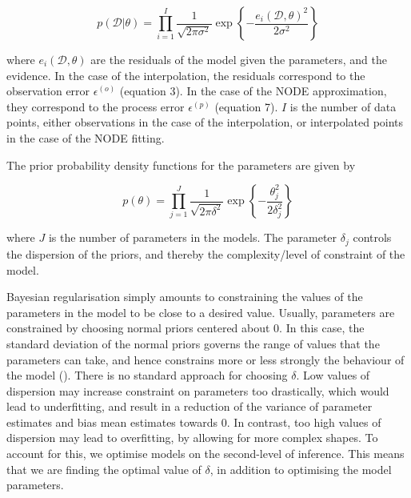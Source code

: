 \documentclass[11pt, oneside]{article}
\begin{document}
\vspace{-0.5cm}
\begin{equation}
	p( \mathcal{D} | \theta) = \prod_{i=1}^{I} \frac{1}{\sqrt{2\pi\sigma^2}}  \exp \left\{ -\frac{e_i(\mathcal{D},\theta)^2}{2\sigma^2}  \right\}
\end{equation}

where $e_i(\mathcal{D},\theta)$ are the residuals of the model given the parameters, and the evidence. 
In the case of the interpolation, the residuals correspond to the observation error $\epsilon^{(o)}$ (equation 3).
In the case of the NODE approximation, they correspond to the process error $\epsilon^{(p)}$ (equation 7).
$I$ is the number of data points, either observations in the case of the interpolation, or interpolated points in the case of the NODE fitting.

The prior probability density functions for the parameters are given by

\vspace{-0.5cm}
\begin{equation}
	p(\theta) = \prod_{j=1}^{J} \frac{1}{\sqrt{2\pi\delta^2}}  \exp \left\{ -\frac{\theta_j^2}{2\delta_j^2}  \right\}
\end{equation}

where $J$ is the number of parameters in the models.
The parameter $\delta_j$ controls the dispersion of the priors, and thereby the complexity/level of constraint of the model.

Bayesian regularisation simply amounts to constraining the values of the parameters in the model to be close to a desired value. 
Usually, parameters are constrained by choosing normal priors centered about 0.
In this case, the standard deviation of the normal priors governs the range of values that the parameters can take, and hence constrains more or less strongly the behaviour of the model (\cite{Cawley2007}).
There is no standard approach for choosing $\delta$.
Low values of dispersion may increase constraint on parameters too drastically, which would lead to underfitting, and result in a reduction of the variance of parameter estimates and bias mean estimates towards 0.
In contrast, too high values of dispersion may lead to overfitting, by allowing for more complex shapes.
To account for this, we optimise models on the second-level of inference.
This means that we are finding the optimal value of $\delta$, in addition to optimising the model parameters. 
\end{document}
